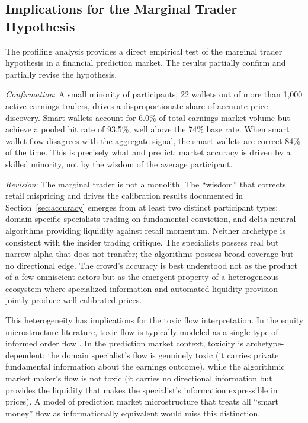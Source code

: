 \documentclass[11pt]{article}
\begin{document}
\subsection{Implications for the Marginal Trader Hypothesis}

The profiling analysis provides a direct empirical test of the marginal trader hypothesis in a financial prediction market. The results partially confirm and partially revise the hypothesis.

\textit{Confirmation}: A small minority of participants, 22 wallets out of more than 1,000 active earnings traders, drives a disproportionate share of accurate price discovery. Smart wallets account for 6.0\% of total earnings market volume but achieve a pooled hit rate of 93.5\%, well above the 74\% base rate. When smart wallet flow disagrees with the aggregate signal, the smart wallets are correct 84\% of the time. This is precisely what \citet{forsythe1992anatomy} and \citet{rothschild2016trading} predict: market accuracy is driven by a skilled minority, not by the wisdom of the average participant.

\textit{Revision}: The marginal trader is not a monolith. The ``wisdom'' that corrects retail mispricing and drives the calibration results documented in Section~\ref{sec:accuracy} emerges from at least two distinct participant types: domain-specific specialists trading on fundamental conviction, and delta-neutral algorithms providing liquidity against retail momentum. Neither archetype is consistent with the insider trading critique. The specialists possess real but narrow alpha that does not transfer; the algorithms possess broad coverage but no directional edge. The crowd's accuracy is best understood not as the product of a few omniscient actors but as the emergent property of a heterogeneous ecosystem where specialized information and automated liquidity provision jointly produce well-calibrated prices.

This heterogeneity has implications for the toxic flow interpretation. In the equity microstructure literature, toxic flow is typically modeled as a single type of informed order flow \citep{easley2012flow}. In the prediction market context, toxicity is archetype-dependent: the domain specialist's flow is genuinely toxic (it carries private fundamental information about the earnings outcome), while the algorithmic market maker's flow is not toxic (it carries no directional information but provides the liquidity that makes the specialist's information expressible in prices). A model of prediction market microstructure that treats all ``smart money'' flow as informationally equivalent would miss this distinction.
\end{document}
